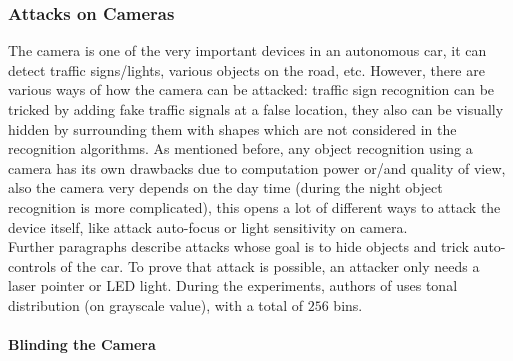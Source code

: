 \subsubsection{Attacks on Cameras}

The camera is one of the very important devices in an autonomous car, it can detect traffic signs/lights, various objects on the road, etc. However, there are various ways of how the camera can be attacked: traffic sign recognition can be tricked by adding fake traffic signals at a false location, they also can be visually hidden by surrounding them with shapes which are not considered in the recognition algorithms. As mentioned before, any object recognition using a camera has its own drawbacks due to computation power or/and quality of view, also the camera very depends on the day time (during the night object recognition is more complicated), this opens a lot of different ways to attack the device itself, like attack auto-focus or light sensitivity on camera. \\
Further paragraphs describe attacks whose goal is to hide objects and trick auto-controls of the car. To prove that attack is possible, an attacker only needs a laser pointer or \gls{LED} light. During the experiments, authors of \cite{AttacksOnSensors} uses tonal distribution (on grayscale value), with a total of $256$ bins.

\paragraph{Blinding the Camera}

